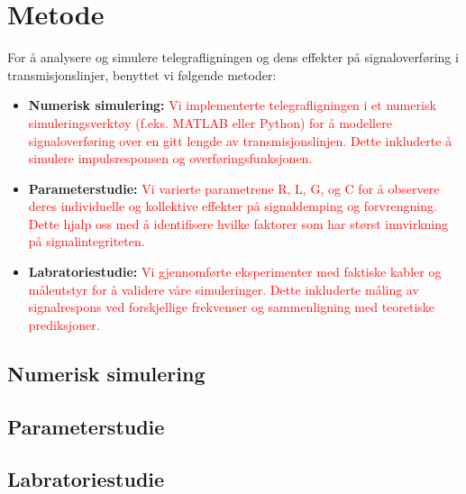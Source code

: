 \section{Metode}
    For å analysere og simulere telegrafligningen og dens effekter på signaloverføring i transmisjonslinjer, benyttet vi følgende metoder:
    
    \begin{itemize}
        
        \item \textbf{Numerisk simulering:} \textcolor{red}{Vi implementerte telegrafligningen i et numerisk simuleringsverktøy (f.eks. MATLAB eller Python) for å modellere signaloverføring over en gitt lengde av transmisjonslinjen. Dette inkluderte å simulere impulsresponsen og overføringsfunksjonen.}
        \item \textbf{Parameterstudie:} \textcolor{red}{Vi varierte parametrene R, L, G, og C for å observere deres individuelle og kollektive effekter på signaldemping og forvrengning. Dette hjalp oss med å identifisere hvilke faktorer som har størst innvirkning på signalintegriteten.}
        \item \textbf{Labratoriestudie:}\textcolor{red}{ Vi gjennomførte eksperimenter med faktiske kabler og måleutstyr for å validere våre simuleringer. Dette inkluderte måling av signalrespons ved forskjellige frekvenser og sammenligning med teoretiske prediksjoner.}
    \end{itemize}
\subsection{Numerisk simulering}
    
\subsection{Parameterstudie}

\subsection{Labratoriestudie}

